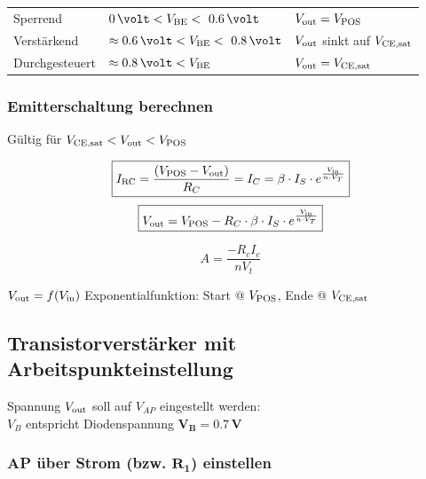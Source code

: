\vspace{0.2cm}


\vspace{0.1cm}

\begin{tabular}{lll}
    Sperrend        & $ 0 \, \volt < V_{\rm BE} < ~0.6 \, \volt$ & $V_{\rm out} = V_{\rm POS}$                          \\
    Verstärkend     & $ \approx 0.6 \, \volt < V_{\rm BE} < ~0.8 \, \volt$ & $V_{\rm out}$ sinkt auf $V_{\rm CE,sat}$   \\
    Durchgesteuert  & $ \approx 0.8 \, \volt < V_{\rm BE}$ & $V_{\rm out} = V_{\rm CE,sat} $ 
\end{tabular}


\subsubsection{Emitterschaltung berechnen}

Gültig für $V_{\rm CE,sat} < V_{\rm out} < V_{\rm POS}$

\begin{minipage}[c]{0.7\columnwidth}
    $$ \boxed{ I_{\rm RC} = \frac{(V_{\rm POS} - V_{\rm out})}{R_C} = I_C = \beta \cdot I_S \cdot e^{\frac{V_{\rm in}}{n \cdot V_T}} } $$
    $$ \boxed{ V_{\rm out} = V_{\rm POS} - R_C \cdot \beta \cdot I_S \cdot e^{\frac{V_{\rm in}}{n \cdot V_T}} } $$
\end{minipage}
\begin{minipage}[c]{0.25\columnwidth}
    \[ \boxed{A = \frac{-R_c I_c}{n V_t}}\]
\end{minipage}

$V_{\rm out} = f(V_{\rm in})$ Exponentialfunktion: Start @ $V_{\rm POS}$, Ende @ $V_{\rm CE,sat}$


\subsection{Transistorverstärker mit Arbeitspunkteinstellung}

Spannung $V_{\rm out}$ soll auf $V_{AP}$ eingestellt werden: \\
$V_B$ entspricht Diodenspannung $\bm{ V_B = 0.7 \, V} $ 


\subsubsection{AP über Strom (bzw. $\bm{R_1}$) einstellen}

